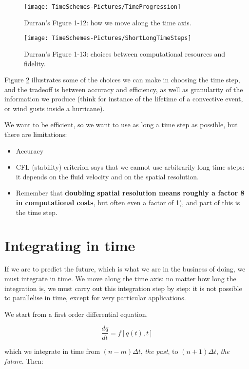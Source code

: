 \begin{figure}[h!]
	\texttt{[image: TimeSchemes-Pictures/TimeProgression]}
	\caption{Durran's Figure 1-12: how we move along the time axis.}
	\label{TimeProgression}
\end{figure}

\begin{figure}[h!]
	\texttt{[image: TimeSchemes-Pictures/ShortLongTimeSteps]}
	\caption{Durran's Figure 1-13: choices between computational resources and fidelity.}
	\label{ShortLongTimeSteps}
\end{figure}

Figure \ref{ShortLongTimeSteps} illustrates some of the choices we can make in choosing the time step, and the tradeoff is between accuracy and efficiency, as well as granularity of the information we produce (think for instance of the lifetime of a convective event, or wind gusts inside a hurricane).

We want to be efficient, so we want to use as long a time step as possible, but there are limitations:
\begin{itemize}
	\item Accuracy
	\item CFL (stability) criterion says that we cannot use arbitrarily long time steps: it depends on the fluid velocity and on the spatial resolution. 
	\item Remember that {\bf doubling spatial resolution means roughly a factor 8 in computational costs}, but often even a factor of 1), and part of this is the time step.
\end{itemize}


\section{Integrating in time}
If we are to predict the future, which is what we are in the business of doing, we must integrate in time. We move along the time axis: no matter how long the integration is, we must carry out this integration step by step: it is not possible to parallelise in time, except for very particular applications.

We start from a first order differential equation.

\begin{equation}
	\frac{dq}{dt}=f[q(t),t]
\end{equation}

which we integrate in time from $(n-m)\Delta t$, \emph{the past}, to $(n+1)\Delta t$, \emph{the future}. Then:

